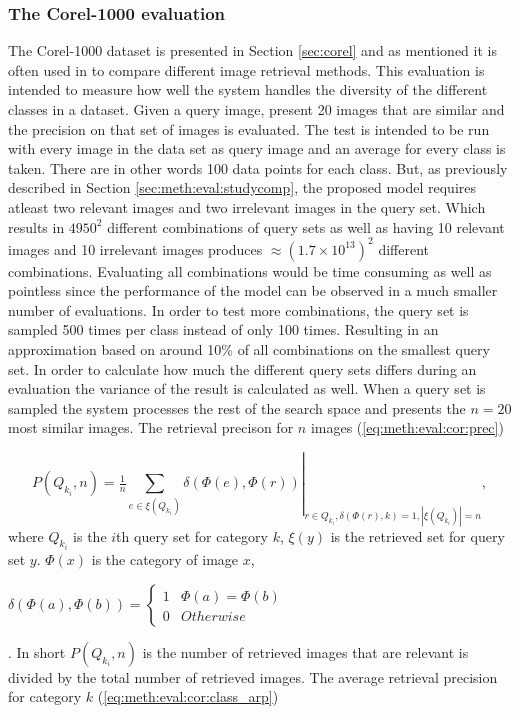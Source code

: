 \subsubsection{The Corel-1000 evaluation}
\label{sec:meth:eval:studycomp:corel}

The Corel-1000 dataset is presented in Section \ref{sec:corel} and as mentioned it is often used in to compare different image retrieval methods. This evaluation is intended to measure how well the system handles the diversity of the different classes in a dataset. Given a query image, present 20 images that are similar and the precision on that set of images is evaluated. The test is intended to be run with every image in the data set as query image and an average for every class is taken. There are in other words 100 data points for each class. But, as previously described in Section \ref{sec:meth:eval:studycomp}, the proposed model requires atleast two relevant images and two irrelevant images in the query set. Which results in $4950^2$ different combinations of query sets as well as having 10 relevant images and 10 irrelevant images produces $\approx (1.7\times 10^{13})^2$ different combinations. Evaluating all combinations would be time consuming as well as pointless since the performance of the model can be observed in a much smaller number of evaluations. In order to test more combinations, the query set is sampled 500 times per class instead of only 100 times. Resulting in an approximation based on around 10\% of all combinations on the smallest query set. In order to calculate how much the different query sets differs during an evaluation the variance of the result is calculated as well. When a query set is sampled the system processes the rest of the search space and presents the $n=20$ most similar images. The retrieval precison for $n$ images (\ref{eq:meth:eval:cor:prec})

\begin{equation}
\label{eq:meth:eval:cor:prec}
P(Q_{k_i}, n) = \left . \tfrac{1}{n}\sum_{e \in \xi(Q_{k_i})} \delta(\Phi(e), \Phi(r)) \right |_{ r \in Q_{k_i},  \delta(\Phi(r), k)=1, |\xi(Q_{k_i})|=n},
\end{equation}
where $Q_{k_i}$ is the $i$th query set for category $k$, $\xi(y)$ is the retrieved set for query set $y$. $\Phi(x)$ is the category of image $x$, \begin{tiny}$\delta(\Phi(a), \Phi(b)) = \left \{ 
\begin{matrix} 
1 & \Phi(a) = \Phi(b) \\
0 & Otherwise
\end{matrix}\right.$\end{tiny}.
 In short $P(Q_{k_i}, n)$ is the number of retrieved images that are relevant is divided by the total number of retrieved images. 
 The average retrieval precision for category $k$ (\ref{eq:meth:eval:cor:class_arp}) 


